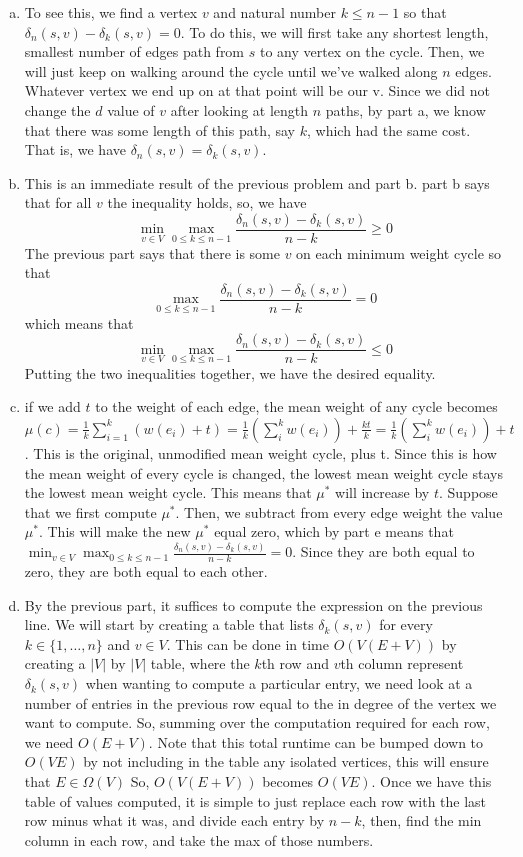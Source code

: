 \documentclass{article}
\begin{document}
\begin{enumerate}[a.]
\item
To see this, we find a vertex $v$ and natural number $k\le n-1$ so that $\delta_n(s,v) - \delta_k(s,v) =0$. To do this, we will first take any shortest length, smallest number of edges path from $s$ to any vertex on the cycle. Then, we will just keep on walking around the cycle until we've walked along $n$ edges. Whatever vertex we end up on at that point will be our v. Since we did not change the $d$ value of $v$ after looking at length $n$ paths, by part a, we know that there was some length of this path, say $k$, which had the same cost. That is, we have $\delta_n(s,v) = \delta_k(s,v)$.

\item
This is an immediate result of the previous problem and part b. part b says that for all $v$ the inequality holds, so, we have
\[
\min_{v\in V} \max_{0\le k\le n-1} \frac{\delta_n(s,v) - \delta_k(s,v)}{n-k} \ge 0
\]
The previous part says that there is some $v$ on each minimum weight cycle so that
\[
\max_{0\le k\le n-1} \frac{\delta_n(s,v) - \delta_k(s,v)}{n-k} = 0
\]
which means that
\[
\min_{v\in V} \max_{0\le k\le n-1} \frac{\delta_n(s,v) - \delta_k(s,v)}{n-k} \le 0
\]
Putting the two inequalities together, we have the desired equality.

\item
if we add $t$ to the weight of each edge, the mean weight of any cycle becomes $\mu(c)= \frac{1}{k} \sum_{i=1}^k(w(e_i) + t) = \frac{1}{k}\left(\sum_{i}^kw(e_i)\right) + \frac{kt}{k} = \frac{1}{k}\left(\sum_{i}^kw(e_i)\right) + t$. This is the original, unmodified mean weight cycle, plus t. Since this is how the mean weight of every cycle is changed, the lowest mean weight cycle stays the lowest mean weight cycle. This means that $\mu^*$ will increase by $t$. Suppose that we first compute $\mu^*$. Then, we subtract from every edge weight the value $\mu^*$. This will make the new $\mu^*$ equal zero, which by part e means that $\min_{v\in V} \max_{0\le k\le n-1} \frac{\delta_n(s,v) - \delta_k(s,v)}{n-k} =0$. Since they are both equal to zero, they are both equal to each other.

\item
By the previous part, it suffices to compute the expression on the previous line. We will start by creating a table that lists $\delta_k(s,v)$ for every $k\in \{1,\ldots, n\}$ and $v\in V$. This can be done in time $O(V(E+V))$ by creating a $|V|$ by $|V|$ table, where the $k$th row and $v$th column represent $\delta_k(s,v)$ when wanting to compute a particular entry, we need look at a number of entries in the previous row equal to the in degree of the vertex we want to compute. So, summing over the computation required for each row, we need $O(E+V)$. Note that this total runtime can be bumped down to $O(VE)$ by not including in the table any isolated vertices, this will ensure that $E \in \Omega(V)$ So, $O(V(E+V))$ becomes $O(VE)$. Once we have this table of values computed, it is simple to just replace each row with the last row minus what it was, and divide each entry by $n-k$, then, find the min column in each row, and take the max of those numbers.

\end{enumerate}
\end{document}
